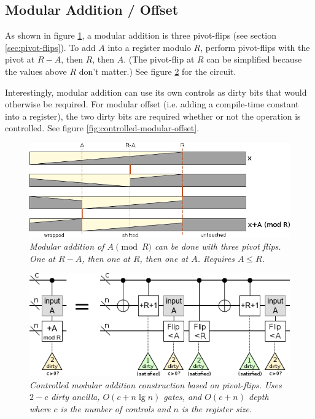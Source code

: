 \documentclass[twocolumn]{article}
\begin{document}
\subsection{Modular Addition / Offset}

As shown in figure \ref{fig:mod-add-from-pivot-flip-bars}, a modular addition is three pivot-flips (see section \ref{sec:pivot-flips}).
To add $A$ into a register modulo $R$, perform pivot-flips with the pivot at $R-A$, then $R$, then $A$.
(The pivot-flip at $R$ can be simplified because the values above $R$ don't matter.)
See figure \ref{fig:controlled-modular-add} for the circuit.

Interestingly, modular addition can use its own controls as dirty bits that would otherwise be required.
For modular offset (i.e. adding a compile-time constant into a register), the two dirty bits are required whether or not the operation is controlled.
See figure \ref{fig:controlled-modular-offset}.

\begin{figure}
  \centering
  \includegraphics[width=\linewidth]{assets/mod-add-from-pivot-flip-bars.png}
  \caption{\em
     Modular addition of $A \pmod{R}$ can be done with three pivot flips.
     One at $R-A$, then one at $R$, then one at $A$.
     Requires $A \leq R$.
   }
  \label{fig:mod-add-from-pivot-flip-bars}
\end{figure}

\begin{figure}
  \centering
  \includegraphics[width=\linewidth]{assets/controlled-modular-addition.png}
  \caption{\em
    Controlled modular addition construction based on pivot-flips.
    Uses $2-c$ dirty ancilla, $O(c + n \lg n)$ gates, and $O(c + n)$ depth where $c$ is the number of controls and $n$ is the register size.
  }
  \label{fig:controlled-modular-add}
\end{figure}
\end{document}
